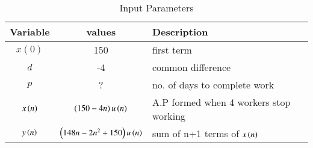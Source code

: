 
\begin{table}[htbp]
\centering
\renewcommand\thetable{1}
\begin{tabular}{|c|c|m{3cm}|}
    \hline
    \textbf{Variable} & \textbf{values} & \textbf{Description} \\
    \hline
    $x(0)$ & 150 & first term\\
    \hline
    $ d $ & -4& common difference\\
    \hline
    $p$ & ? & no. of days to complete work\\
    \hline
    $x\left(n\right)$ & $\left(150-4n\right)u\left(n\right)$ & A.P formed when 4 workers stop working \\
    \hline
    $y\left(n\right)$ &$\left(148n - 2n^2 + 150\right)u\left(n\right)$ & sum of n+1 terms of $x\left(n\right)$ \\
    \hline
\end{tabular}
\caption{Input Parameters}
\label{tab:11.9.5.32}
\end{table}

